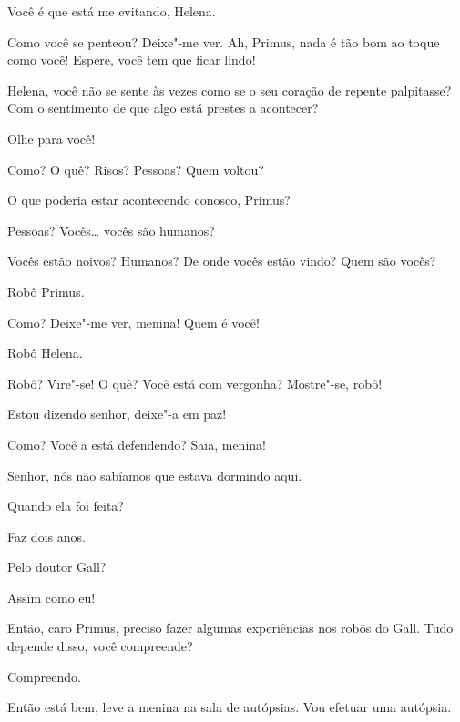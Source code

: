  Você é que está me evitando, Helena.

 Como você se penteou? Deixe"-me ver.  Ah, Primus, nada é tão bom ao toque como você! Espere, você tem
que ficar lindo!

 Helena, você não se sente às vezes como se o seu coração de repente palpitasse?
Com o sentimento de que algo está prestes a acontecer?

  Olhe para você!

  Como? O quê? Risos? Pessoas? Quem voltou?

  O que poderia estar acontecendo conosco, Primus?

  Pessoas? Vocês\ldots{} vocês são
humanos?

 Vocês estão noivos? Humanos? De onde vocês estão vindo?  Quem são vocês?

 Robô Primus.

 Como? Deixe"-me ver, menina! Quem é você!

 Robô Helena.

 Robô? Vire"-se! O quê? Você está com vergonha?  Mostre"-se, robô!

 Estou dizendo senhor, deixe"-a em paz!

 Como? Você a está defendendo? Saia, menina!

 Senhor, nós não sabíamos que estava dormindo aqui.

 Quando ela foi feita?

 Faz dois anos.

 Pelo doutor Gall?

 Assim como eu!

 Então, caro Primus, preciso fazer algumas experiências nos
robôs do Gall. Tudo depende disso, você compreende?

 Compreendo.

 Então está bem, leve a menina na sala de autópsias. Vou efetuar uma
autópsia.

